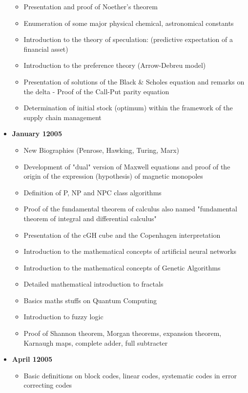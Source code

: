 \begin{itemize}
\begin{itemize}[noitemsep]
			\item Presentation and proof of Noether's theorem
			\item Enumeration of some major physical chemical, astronomical constants
			\item Introduction to the theory of speculation: (predictive expectation of a financial asset)
			\item Introduction to the preference theory (Arrow-Debreu model)
			\item Presentation of solutions of the Black \& Scholes equation and remarks on the delta - Proof of the Call-Put parity equation
			\item Determination of initial stock (optimum) within the framework of the supply chain management
		\end{itemize}
	\item \textbf{January 12005}
		\begin{itemize}[noitemsep]
			\item New Biographies (Penrose, Hawking, Turing, Marx) 
			\item Development of "dual" version of Maxwell equations and proof of the origin of the expression (hypothesis) of magnetic monopoles 
			\item Definition of P, NP and NPC class algorithms
			\item Proof of the fundamental theorem of calculus also named "fundamental theorem of integral and differential calculus" 
			\item Presentation of the cGH cube and the Copenhagen interpretation 
			\item Introduction to the mathematical concepts of artificial neural networks 
			\item Introduction to the mathematical concepts of Genetic Algorithms
			\item Detailed mathematical introduction to fractals
			\item Basics maths stuffs on Quantum Computing
			\item Introduction to fuzzy logic
			\item Proof of Shannon theorem, Morgan theorems, expansion theorem, Karnaugh maps, complete adder, full subtracter
		\end{itemize}
	\item \textbf{April 12005}
		\begin{itemize}[noitemsep]
			\item Basic definitions on block codes, linear codes, systematic codes in error correcting codes

\end{itemize}
\end{itemize}

